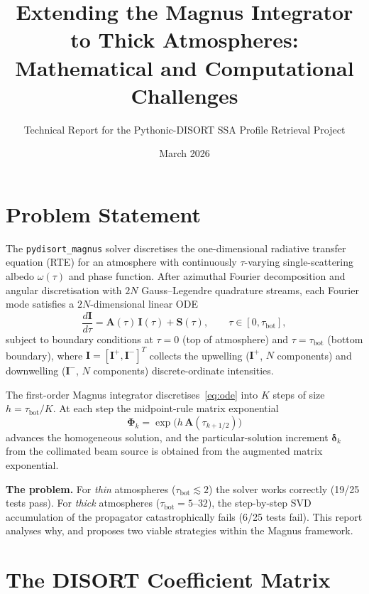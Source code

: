 \documentclass[11pt,a4paper]{article}
\title{Extending the Magnus Integrator to Thick Atmospheres:\\
Mathematical and Computational Challenges}
\author{Technical Report for the Pythonic-DISORT SSA Profile Retrieval Project}
\date{March 2026}
\newcommand{\vect}[1]{\bm{#1}}
\newcommand{\mat}[1]{\mathbf{#1}}
\newcommand{\tbot}{\tau_{\mathrm{bot}}}
\theoremstyle{definition}
\begin{document}
\maketitle

\section{Problem Statement}

The \texttt{pydisort\_magnus} solver discretises the one-dimensional radiative
transfer equation (RTE) for an atmosphere with continuously
$\tau$-varying single-scattering albedo $\omega(\tau)$ and phase function.
After azimuthal Fourier decomposition and angular discretisation with $2N$
Gauss--Legendre quadrature streams, each Fourier mode satisfies a $2N$-dimensional
linear ODE
\begin{equation}\label{eq:ode}
  \frac{d\vect{I}}{d\tau} = \mat{A}(\tau)\,\vect{I}(\tau) + \vect{S}(\tau),
  \qquad \tau\in[0,\tbot],
\end{equation}
subject to boundary conditions at $\tau=0$ (top of atmosphere) and $\tau=\tbot$
(bottom boundary), where $\vect{I}=[\vect{I}^+, \vect{I}^-]^T$ collects the
upwelling ($\vect{I}^+$, $N$ components) and downwelling ($\vect{I}^-$, $N$
components) discrete-ordinate intensities.

The first-order Magnus integrator discretises~\eqref{eq:ode} into $K$ steps of
size $h=\tbot/K$.  At each step the midpoint-rule matrix exponential
\begin{equation}\label{eq:magnus_step}
  \mat{\Phi}_k = \exp\!\bigl(h\,\mat{A}(\tau_{k+1/2})\bigr)
\end{equation}
advances the homogeneous solution, and the particular-solution increment
$\vect{\delta}_k$ from the collimated beam source is obtained from the augmented
matrix exponential.

\textbf{The problem.}  For \emph{thin} atmospheres ($\tbot\lesssim 2$) the
solver works correctly (19/25 tests pass).  For \emph{thick} atmospheres
($\tbot=5$--$32$), the step-by-step SVD accumulation of the propagator
catastrophically fails (6/25 tests fail).  This report analyses why, and
proposes two viable strategies within the Magnus framework.


\section{The DISORT Coefficient Matrix}\label{sec:A_structure}
\end{document}
